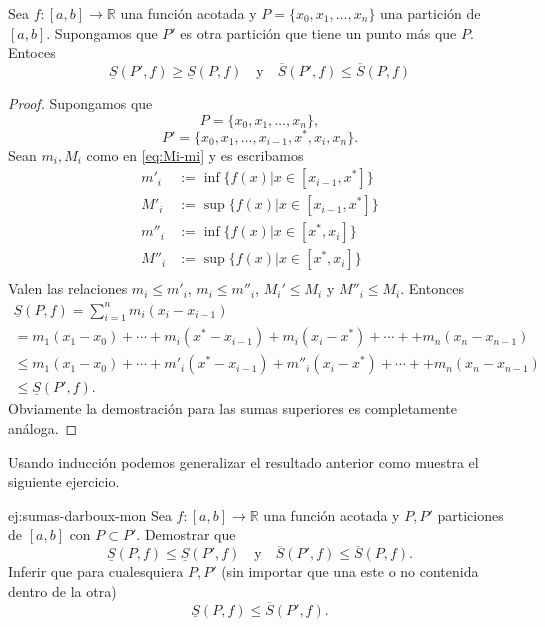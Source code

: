 \begin{lema}{}  Sea $f:[a,b]\to\mathbb{R}$ una función acotada y $P=\{x_0,x_1,\ldots,x_n\}$ una partición de $[a,b]$. Supongamos que $P'$ es otra partición que tiene un punto más que $P$. Entoces
 \[
  \underline{S}(P',f)\geq \underline{S}(P,f)\quad\text{y}\quad \overline{S}(P',f)\leq \overline{S}(P,f)
 \]
\end{lema}

\begin{proof} Supongamos que 
\[P=\{x_0,x_1,\ldots,x_n\},\]
\[P'=\{x_0,x_1,\ldots,x_{i-1},x^*,x_{i},x_n\}.\]
Sean $m_i,M_i$ como en \eqref{eq:Mi-mi} 
y es escribamos 
\[
 \begin{split}
    m'_i&:=\inf\{f(x)| x\in [x_{i-1},x^*]\}\\
    M'_i&:=\sup\{f(x)| x\in [x_{i-1},x^*]\}\\
    m''_i&:=\inf\{f(x)| x\in [x^*,x_i]\}\\
    M''_i&:=\sup\{f(x)| x\in [x^*,x_i]\}\\
 \end{split}
\]
 Valen las relaciones $m_i\leq m'_i$, $m_i\leq m''_i$, $M_i'\leq M_i$ y $M''_i\leq M_i$. Entonces
 \begin{multline*}
 \underline{S}(P,f)=\sum_{i=1}^nm_i(x_i-x_{i-1})\\=
 m_1(x_1-x_0)+\cdots+m_i(x^*-x_{i-1})+m_i(x_i-x^*)+\cdots++m_n(x_n-x_{n-1})\\
 \leq m_1(x_1-x_0)+\cdots+m'_i(x^*-x_{i-1})+m''_i(x_i-x^*)+\cdots++m_n(x_n-x_{n-1})\\
 \leq \underline{S}(P',f).
\end{multline*}
 Obviamente la demostración para las sumas superiores es completamente análoga.  
\end{proof}

Usando inducción podemos generalizar el resultado anterior como muestra el siguiente ejercicio.

\begin{ejercicio}{ej:sumas-darboux-mon} Sea $f:[a,b]\to\mathbb{R}$ una función acotada y $P,P'$ particiones de $[a,b]$ con $P\subset P'$. Demostrar que 
  \[
  \underline{S}(P,f)\leq \underline{S}(P',f)\quad\text{y}\quad \overline{S}(P',f)\leq \overline{S}(P,f).
 \]
 Inferir que para cualesquiera $P,P'$ (sin importar que una este o no contenida dentro de la otra)
   \[
\underline{S}(P,f)\leq \overline{S}(P',f).
 \]
 
\end{ejercicio}

